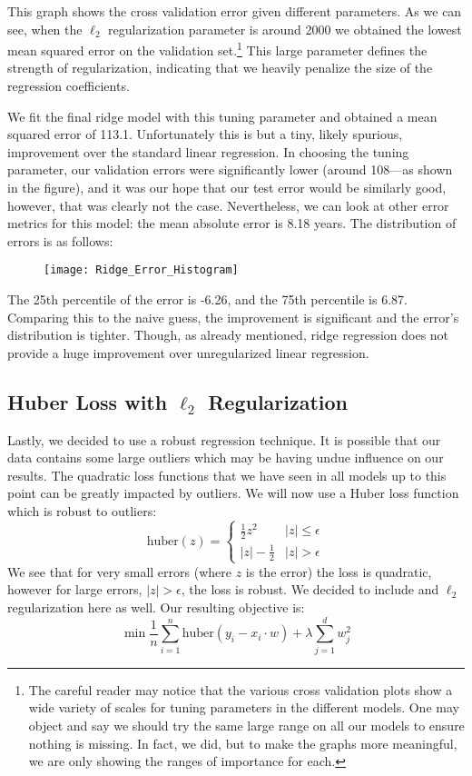 \documentclass[letterpaper, 10 pt, conference]{ieeeconf}  %
\begin{document}
This graph shows the cross validation error given different parameters. As we can see, when the $\ell_2$ regularization parameter is around 2000 we obtained the lowest mean squared error on the validation set.\footnote{The careful reader may notice that the various cross validation plots show a wide variety of scales for tuning parameters in the different models. One may object and say we should try the same large range on all our models to ensure nothing is missing. In fact, we did, but to make the graphs more meaningful, we are only showing the ranges of importance for each.} This large parameter defines the strength of regularization, indicating that we heavily penalize the size of the regression coefficients.

We fit the final ridge model with this tuning parameter and obtained a mean squared error of 113.1. Unfortunately this is but a tiny, likely spurious, improvement over the standard linear regression. In choosing the tuning parameter, our validation errors were significantly lower (around 108---as shown in the figure), and it was our hope that our test error would be similarly good, however, that was clearly not the case. Nevertheless, we can look at other error metrics for this model: the mean absolute error is 8.18 years. The distribution of errors is as follows:

\begin{figure}[ht]
\label{Ridge Error Plot}
\begin{center}
\texttt{[image: Ridge\_Error\_Histogram]}
\end{center}
\end{figure}

The 25th percentile of the error is -6.26, and the 75th percentile is 6.87. Comparing this to the naive guess, the improvement is significant and the error's distribution is tighter. Though, as already mentioned, ridge regression does not provide a huge improvement over unregularized linear regression.

\subsection{Huber Loss with $\ell_2$ Regularization}
Lastly, we decided to use a robust regression technique. It is possible that our data contains some large outliers which may be having undue influence on our results. The quadratic loss functions that we have seen in all models up to this point can be greatly impacted by outliers. We will now use a Huber loss function which is robust to outliers:
\[
	\text{huber}(z) = \begin{cases}
    	\frac{1}{2}z^2		& |z| \leq \epsilon	\\
        |z| - \frac{1}{2}	& |z| > \epsilon
        \end{cases}
\]
We see that for very small errors (where $z$ is the error) the loss is quadratic, however for large errors, $|z| > \epsilon$, the loss is robust. We decided to include and $\ell_2$ regularization here as well. Our resulting objective is:
\[
	\min \frac{1}{n} \sum_{i=1}^n \text{huber}(y_i - x_i\cdot w) + \lambda \sum_{j=1}^d w_j^2
\]
\end{document}
